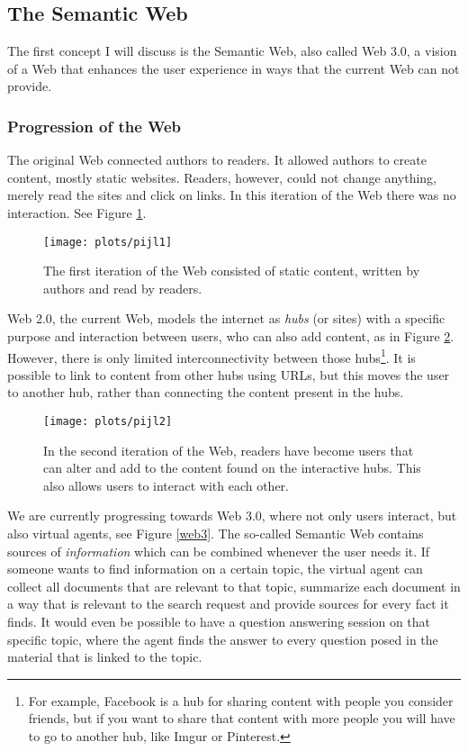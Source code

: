\documentclass{article}
\begin{document}
 \subsection{The Semantic Web}
  The first concept I will discuss is the Semantic Web, also called Web 3.0, a vision of a Web that enhances the user experience in ways that the current Web can not provide.
 \subsubsection{Progression of the Web}
 The original Web connected authors to readers. It allowed authors to create content, mostly static websites. Readers, however, could not change anything, merely read the sites and click on links. In this iteration of the Web there was no interaction. See Figure \ref{web1}. %
 
 \begin{figure}[H]
 \centering
 \texttt{[image: plots/pijl1]}
 \caption[Web 1.0]{The first iteration of the Web consisted of static content, written by authors and read by readers.}
 \label{web1}
 \end{figure}
 
 Web 2.0, the current Web, models the internet as \textit{hubs} (or sites) with a specific purpose and interaction between users, who can also add content, as in Figure \ref{web2}. However, there is only limited interconnectivity between those hubs\footnote{For example, Facebook is a hub for sharing content with people you consider friends, but if you want to share that content with more people you will have to go to another hub, like Imgur or Pinterest.}. %
 It is possible to link to content from other hubs using URLs, but this moves the user to another hub, rather than connecting the content present in the hubs.
 
 \begin{figure}[H]
 \centering
 \texttt{[image: plots/pijl2]}
 \caption[Web 2.0]{In the second iteration of the Web, readers have become users that can alter and add to the content found on the interactive hubs. This also allows users to interact with each other.}
 \label{web2}
 \end{figure}
 
 We are currently progressing towards Web 3.0, where not only users interact, but also virtual agents, see Figure \ref{web3}. The so-called Semantic Web contains sources of \textit{information} which can be combined whenever the user needs it. 
 If someone wants to find information on a certain topic, the virtual agent can collect all documents that are relevant to that topic, summarize each document in a way that is relevant to the search request and provide sources for every fact it finds. It would even be possible to have a question answering session on that specific topic, where the agent finds the answer to every question posed in the material that is linked to the topic.
 
\end{document}
